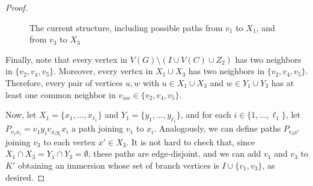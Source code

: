 \documentclass[a4paper,12pt]{article}
\begin{document}
\begin{proof}
\begin{figure}[h]
\caption{The current structure, including possible paths from $v_1$ to $X_1$, and from $v_3$ to $X_3$}
\end{figure}


    Finally, note that every vertex in $V(G)\setminus(I\cup V(C)\cup Z_2)$ has two neighbors in $\{v_2, v_4, v_5\}$.
    Moreover, every vertex in $X_1\cup X_3$ has two neighbors in $\{v_2, v_4, v_5\}$.
    Therefore, every pair of vertices $u,w$ with $u\in X_1\cup X_3$ and $w\in Y_1\cup Y_3$ has at least one common neighbor in $v_{uw}\in\{v_2, v_4, v_5\}$.

    Now, let \(X_1 = \{x_1,\ldots,x_{\ell_1}\}\) and \(Y_1 = \{y_1,\ldots,y_{\ell_1}\}\),
    and for each \(i \in \{1,\ldots,\ell_1\}\), let \(P_{v_1 x_i} = v_1 y_i v_{x_iy_i} x_i\) a path joining \(v_1\) to \(x_i\).
    Analogously, we can define paths \(P_{v_3 x'}\) joining \(v_3\) to each vertex \(x'\in X_3\).
    It is not hard to check that, since \(X_1 \cap X_3 = Y_1 \cap Y_3 = \emptyset\),
    these paths are edge-disjoint,
    and we can add \(v_1\) and \(v_3\) to \(K'\)
    obtaining an immersion whose set of branch vertices is \(I\cup \{v_1,v_3\}\),
    as desired.
    \end{proof}

%


\end{document}
